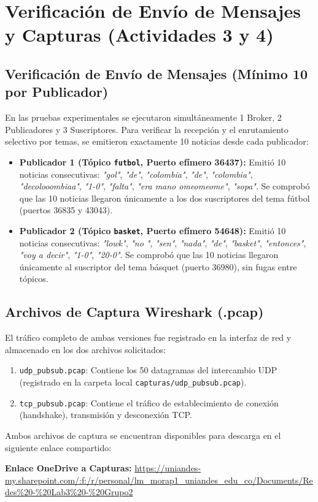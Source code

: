 \documentclass[11pt,a4paper]{article}
\begin{document}
\section{Verificación de Envío de Mensajes y Capturas (Actividades 3 y 4)}

\subsection{Verificación de Envío de Mensajes (Mínimo 10 por Publicador)}
En las pruebas experimentales se ejecutaron simultáneamente 1 Broker, 2 Publicadores y 3 Suscriptores. Para verificar la recepción y el enrutamiento selectivo por temas, se emitieron exactamente 10 noticias desde cada publicador:

\begin{itemize}
    \item \textbf{Publicador 1 (Tópico \texttt{futbol}, Puerto efímero 36437):} Emitió 10 noticias consecutivas:
    \textit{"gol"}, \textit{"de"}, \textit{"colombia"}, \textit{"de"}, \textit{"colombia"}, \textit{"decolooombiaa"}, \textit{"1-0"}, \textit{"falta"}, \textit{"era mano omeomeome"}, \textit{"sopa"}.
    Se comprobó que las 10 noticias llegaron únicamente a los dos suscriptores del tema fútbol (puertos 36835 y 43043).
    \item \textbf{Publicador 2 (Tópico \texttt{basket}, Puerto efímero 54648):} Emitió 10 noticias consecutivas:
    \textit{"lowk"}, \textit{"no "}, \textit{"sen"}, \textit{"nada"}, \textit{"de"}, \textit{"basket"}, \textit{"entonces"}, \textit{"voy a decir"}, \textit{"1-0"}, \textit{"20-0"}.
    Se comprobó que las 10 noticias llegaron únicamente al suscriptor del tema básquet (puerto 36980), sin fugas entre tópicos.
\end{itemize}

\subsection{Archivos de Captura Wireshark (.pcap)}
El tráfico completo de ambas versiones fue registrado en la interfaz de red y almacenado en los dos archivos solicitados:
\begin{enumerate}
    \item \texttt{udp\_pubsub.pcap}: Contiene los 50 datagramas del intercambio UDP (registrado en la carpeta local \texttt{capturas/udp\_pubsub.pcap}).
    \item \texttt{tcp\_pubsub.pcap}: Contiene el tráfico de establecimiento de conexión (handshake), transmisión y desconexión TCP.
\end{enumerate}
Ambos archivos de captura se encuentran disponibles para descarga en el siguiente enlace compartido:
\begin{center}
\textbf{Enlace OneDrive a Capturas:} \url{https://uniandes-my.sharepoint.com/:f:/r/personal/lm_morap1_uniandes_edu_co/Documents/Redes%20-%20Lab3%20-%20Grupo2}
\end{center}
\end{document}
